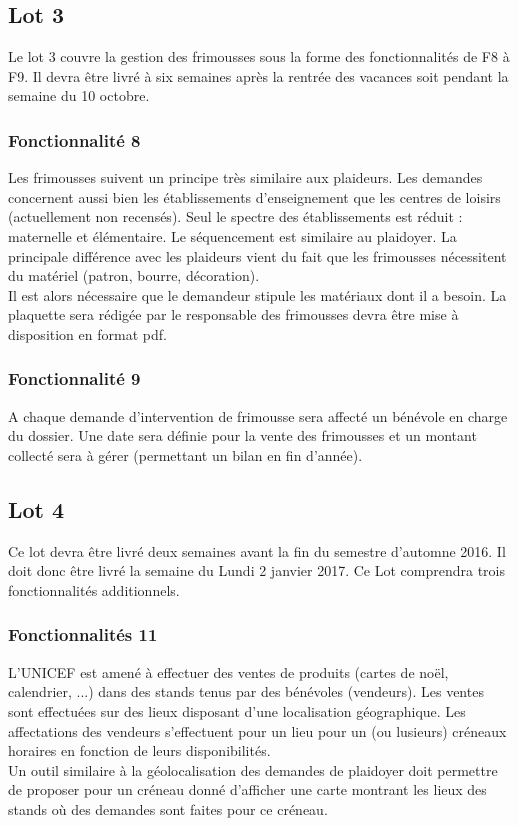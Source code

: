 \subsection{Lot 3}

Le lot 3 couvre la gestion des frimousses sous la forme des fonctionnalités de F8 à F9. Il devra être livré à six semaines après la rentrée des vacances soit pendant la semaine du 10 octobre.
\\

\subsubsection{Fonctionnalité 8}
Les frimousses suivent un principe très similaire aux plaideurs. Les demandes concernent aussi bien les établissements d'enseignement que les centres de loisirs (actuellement non recensés). Seul le spectre des établissements est réduit : maternelle et élémentaire. Le séquencement est similaire au plaidoyer.
La principale différence avec les plaideurs vient du fait que les frimousses nécessitent du matériel (patron, bourre, décoration). \\
 Il est alors nécessaire que le demandeur stipule les matériaux dont il a
besoin.
La plaquette sera rédigée par le responsable des frimousses devra être mise à disposition en format pdf. 
\\

\subsubsection{Fonctionnalité 9}
A chaque demande d'intervention de frimousse sera affecté un bénévole en charge du dossier. Une date sera définie pour la vente des frimousses et un montant collecté sera à gérer (permettant un bilan en fin d'année).
\\

\subsection{Lot 4}
Ce lot devra être livré deux semaines avant la fin du semestre d'automne 2016.  Il doit donc être livré la semaine du Lundi 2 janvier 2017. Ce Lot comprendra trois fonctionnalités additionnels.
\\

\subsubsection{Fonctionnalités 11}
L'UNICEF est amené à effectuer des ventes de produits (cartes de noël, calendrier, ...) dans des stands tenus par des bénévoles (vendeurs). Les ventes sont effectuées sur des lieux disposant d'une localisation géographique. Les affectations des vendeurs s'effectuent pour un lieu pour un (ou lusieurs) créneaux horaires en fonction de leurs disponibilités.
\\
Un outil similaire à la géolocalisation des demandes de plaidoyer doit permettre de proposer pour un créneau donné d'afficher une carte montrant les lieux des stands où des demandes sont faites pour ce créneau.
\\

